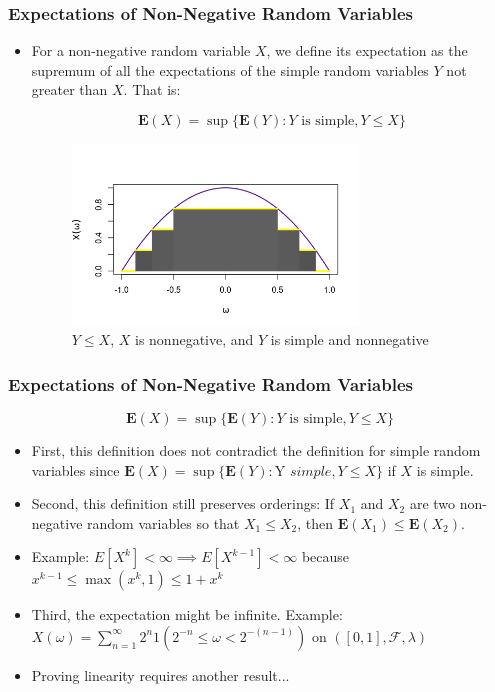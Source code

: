 \documentclass[handout]{beamer}
\newcommand{\BE}{\mathbf{E}}
\begin{document}
\frame
{
\frametitle{Expectations of Non-Negative Random Variables}

\begin{itemize}


\item<1-> For a non-negative random variable $X$, we define its expectation as the supremum of all the expectations of the simple random variables $Y$ not greater than $X$. That is:
                         
$$\BE(X)=\sup\{\BE(Y): Y\text{ is simple}, Y\leq X\}$$


\begin{figure}[h!]
  \includegraphics[width=76mm]{RandLintegrals.png}
  \caption{$Y \leq X$, $X$ is nonnegative, and $Y$ is simple and nonnegative}
\end{figure}





\end{itemize}
}

\frame
{
\frametitle{Expectations of Non-Negative Random Variables}

$$\BE(X)=\sup\{\BE(Y): Y\text{ is simple}, Y\leq X\}$$


\begin{itemize}

\item<2->First, this definition does not contradict the definition for simple random variables since $\BE(X)=\sup\{\BE(Y): \text{Y } simple, Y\leq X\}$ if $X$ is simple.
 
\item<3->Second, this definition still preserves orderings: If $X_1$ and $X_2$ are two non-negative random variables so that $X_1\leq X_2$, then $\BE(X_1)\leq \BE(X_2)$. 

\item<4-> Example: $E[X^k] < \infty \implies E[X^{k-1}] < \infty$ because $x^{k-1} \le \max(x^k,1) \le 1 + x^k$

\item<5->Third, the expectation might be infinite. Example: $X(\omega) = \sum_{n=1}^{\infty} 2^n 1(2^{-n} \le \omega < 2^{-(n-1)})$ on $([0,1], \mathcal{F}, \lambda)$

\item<6-> Proving linearity requires another result...

\end{itemize}
}
\end{document}
